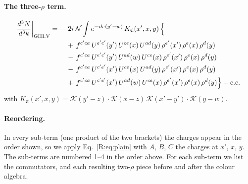 \documentclass[10pt]{article}
\numberwithin{equation}{section}
\newcommand{\KK}{\mathcal K}
\newcommand{\NN}{\mathcal N}
\begin{document}
\paragraph{The three-$\rho$ term.}
\begin{align}
\frac{d^3N}{d^3k}\bigg|_{\rm GIII.V}={}&-2i\,\NN\int e^{-ik\cdot(y'-w)}\,K_{\mathfrak C}(x',x,y)\,\Big\{\notag\\
&\quad +\,f^{c'ca}\,U^{e'c'}(y')\,U^{ce}(x)\,U^{ad}(y)\,\rho^{e'}(x')\,\rho^{e}(x)\,\rho^{d}(y)\notag\\
&\quad -\,f^{c'ca}\,U^{e'c'}(y')\,U^{ad}(w)\,U^{ce}(x)\,\rho^{e'}(x')\,\rho^{e}(x)\,\rho^{d}(y)\notag\\
&\quad -\,f^{c'ca}\,U^{c'e'}(x')\,U^{ce}(x)\,U^{ad}(y)\,\rho^{e'}(x')\,\rho^{e}(x)\,\rho^{d}(y)\notag\\
&\quad +\,f^{c'ca}\,U^{c'e'}(x')\,U^{ad}(w)\,U^{ce}(x)\,\rho^{e'}(x')\,\rho^{e}(x)\,\rho^{d}(y)\Big\}+{\rm c.c.}\label{R:eq:in-GIII.V}
\end{align}
with $K_{\mathfrak C}(x',x,y)=\KK(y'-z)\cdot\KK(x-z)\,\KK(x'-y')\cdot\KK(y-w)$.
\paragraph{Reordering.} In every sub-term (one product of the two brackets) the charges appear in the order shown, so we apply Eq.~\eqref{R:eq:plain} with $A$, $B$, $C$ the charges at $x'$, $x$, $y$. The sub-terms are numbered 1--4 in the order above. For each sub-term we list the commutators, and each resulting two-$\rho$ piece before and after the colour algebra.
\end{document}
